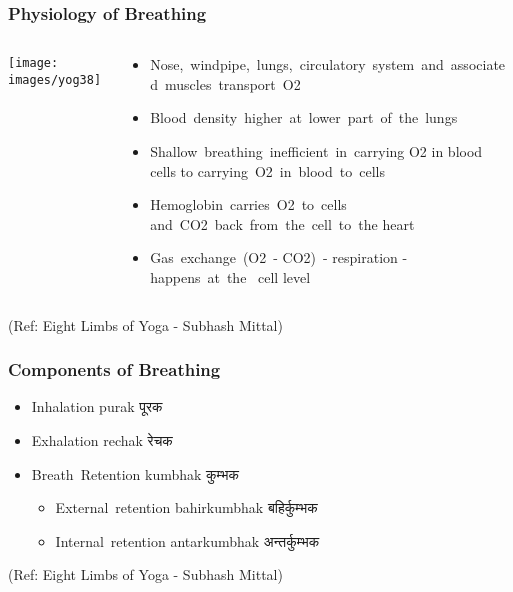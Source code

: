 \begin{frame}[fragile]\frametitle{Physiology of Breathing }

   \begin{columns}
    \begin{column}[t]{0.4\linewidth}
	
\begin{center}
\texttt{[image: images/yog38]}
\end{center}


    \end{column}
    \begin{column}[t]{0.6\linewidth}
	\begin{itemize}
	\item  Nose, windpipe, lungs, circulatory system and associated muscles transport O2
	\item  Blood density higher at lower part of the lungs
	\item   Shallow breathing inefficient in carrying O2 in blood cells to carrying O2 in blood to cells
	\item   Hemoglobin carries O2 to cells 
and CO2 back from the cell to the heart 
	\item  Gas exchange (O2 - CO2) - respiration - happens at the 
cell level
	\end{itemize}

    \end{column}
  \end{columns}

\tiny{(Ref: Eight Limbs of Yoga - Subhash Mittal)}

\end{frame}

\begin{frame}[fragile]\frametitle{Components of Breathing}


	\begin{itemize}
	\item  Inhalation purak पूरक
	\item  Exhalation rechak रेचक
	\item Breath Retention kumbhak कुम्भक
	\begin{itemize}
	
	\item External retention bahirkumbhak बहिर्कुम्भक
	\item Internal retention antarkumbhak अन्तर्कुम्भक
	\end{itemize}
	
	\end{itemize}

\tiny{(Ref: Eight Limbs of Yoga - Subhash Mittal)}

\end{frame}

